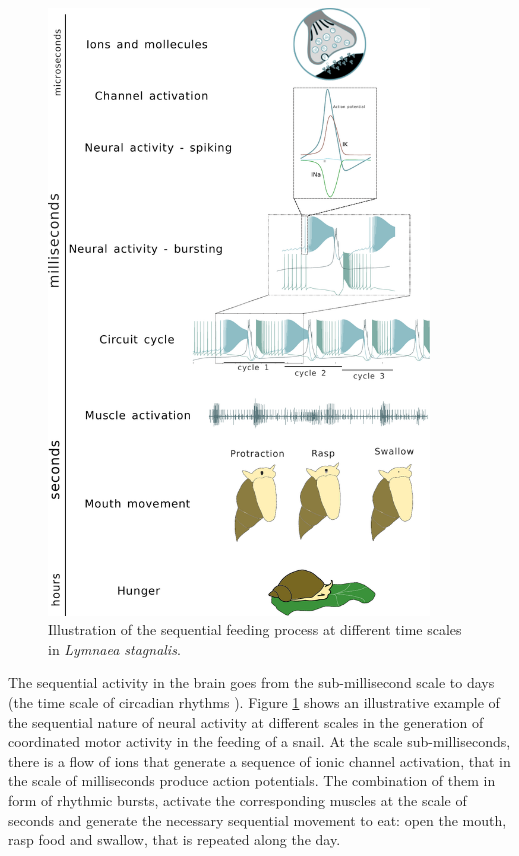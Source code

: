 \begin{figure}[hbt!]
	\centering
	\includegraphics[width=0.9\textwidth]{img/intro/time scale/time-scale-feeding.pdf}
	\caption{Illustration of the sequential feeding process at different time scales in {\sl Lymnaea stagnalis}.}
	\label{fig:time scale feeding}
\end{figure}

The sequential activity in the brain goes from the sub-millisecond scale to days (the time scale of circadian rhythms \parencite{mauk_neural_2004}). Figure \ref{fig:time scale feeding} shows an illustrative example of the sequential nature of neural activity at different scales in the generation of coordinated motor activity in the feeding of a snail. At the scale sub-milliseconds, there is a flow of ions that generate a sequence of ionic channel activation, that in the scale of milliseconds produce action potentials. The combination of them in form of rhythmic bursts, activate the corresponding muscles at the scale of seconds and generate the necessary sequential movement to eat: open the mouth, rasp food and swallow, that is  repeated along the day. 



